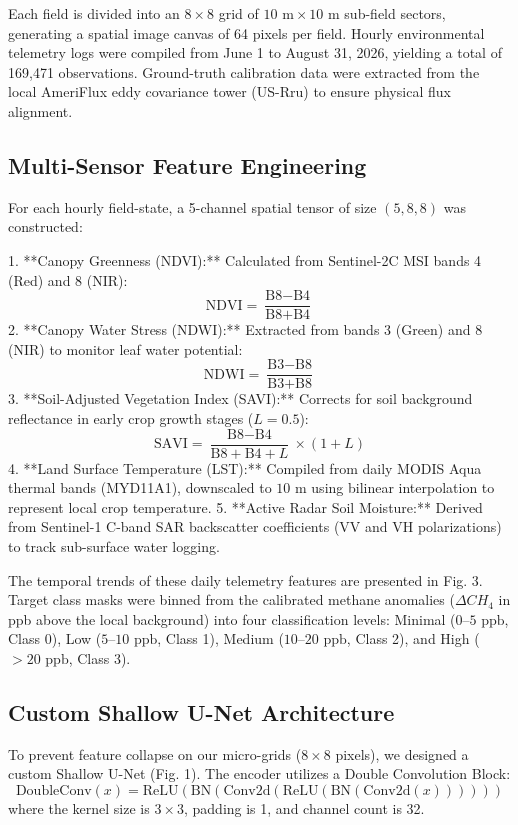 \documentclass[final,3p,times,twocolumn]{elsarticle}
\begin{document}
Each field is divided into an $8\times 8$ grid of $10\text{ m} \times 10\text{ m}$ sub-field sectors, generating a spatial image canvas of 64 pixels per field. Hourly environmental telemetry logs were compiled from June 1 to August 31, 2026, yielding a total of 169,471 observations. Ground-truth calibration data were extracted from the local AmeriFlux eddy covariance tower (US-Rru) to ensure physical flux alignment.

\subsection{Multi-Sensor Feature Engineering}
For each hourly field-state, a 5-channel spatial tensor of size $(5, 8, 8)$ was constructed:

1.  **Canopy Greenness (NDVI):** Calculated from Sentinel-2C MSI bands 4 (Red) and 8 (NIR):
    $$\text{NDVI} = \frac{\text{B8} - \text{B4}}{\text{B8} + \text{B4}}$$
2.  **Canopy Water Stress (NDWI):** Extracted from bands 3 (Green) and 8 (NIR) to monitor leaf water potential:
    $$\text{NDWI} = \frac{\text{B3} - \text{B8}}{\text{B3} + \text{B8}}$$
3.  **Soil-Adjusted Vegetation Index (SAVI):** Corrects for soil background reflectance in early crop growth stages ($L=0.5$):
    $$\text{SAVI} = \frac{\text{B8} - \text{B4}}{\text{B8} + \text{B4} + L} \times (1 + L)$$
4.  **Land Surface Temperature (LST):** Compiled from daily MODIS Aqua thermal bands (MYD11A1), downscaled to $10\text{ m}$ using bilinear interpolation to represent local crop temperature.
5.  **Active Radar Soil Moisture:** Derived from Sentinel-1 C-band SAR backscatter coefficients (VV and VH polarizations) to track sub-surface water logging.

The temporal trends of these daily telemetry features are presented in Fig. 3. Target class masks were binned from the calibrated methane anomalies ($\Delta CH_4$ in ppb above the local background) into four classification levels: Minimal ($0$--$5\text{ ppb}$, Class 0), Low ($5$--$10\text{ ppb}$, Class 1), Medium ($10$--$20\text{ ppb}$, Class 2), and High ($>20\text{ ppb}$, Class 3).

\subsection{Custom Shallow U-Net Architecture}
To prevent feature collapse on our micro-grids ($8\times 8$ pixels), we designed a custom Shallow U-Net (Fig. 1). The encoder utilizes a Double Convolution Block:
$$\text{DoubleConv}(x) = \text{ReLU}(\text{BN}(\text{Conv2d}(\text{ReLU}(\text{BN}(\text{Conv2d}(x))))))$$
where the kernel size is $3\times 3$, padding is 1, and channel count is 32. 
\end{document}
